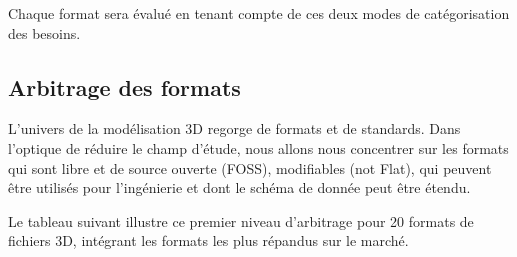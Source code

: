 Chaque format sera évalué en tenant compte de ces deux modes de catégorisation des besoins.

\newpage

\subsection{Arbitrage des formats}

L'univers de la modélisation 3D regorge de formats et de standards. Dans l'optique de réduire le champ d'étude, nous allons nous concentrer sur les formats qui sont libre et de source ouverte (FOSS), modifiables (not Flat), qui peuvent être utilisés pour l'ingénierie et dont le schéma de donnée peut être étendu.

Le tableau suivant illustre ce premier niveau d'arbitrage pour 20 formats de fichiers 3D, intégrant les formats les plus répandus sur le marché.


\newcommand{\fosscolor}[1]{\ifthenelse{\equal{#1}{Oui}}{\textcolor{mygreen}{#1}}{\textcolor{myred}{#1}}}
\newcommand{\flatcolor}[1]{\ifthenelse{\equal{#1}{Non}}{\textcolor{mygreen}{#1}}{\textcolor{myred}{#1}}}
\newcommand{\domainecolor}[1]{\ifthenelse{\equal{#1}{Impression 3D}}{\textcolor{myred}{#1}}{#1}}
\newcommand{\extensiblecolor}[1]{\ifthenelse{\equal{#1}{Oui}}{\textcolor{mygreen}{#1}}{\textcolor{myred}{#1}}}


